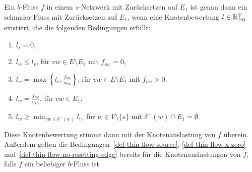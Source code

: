 \begin{lemma}\label{lemma-thin-flow-t-def}
	Ein $b$-Fluss $f$ in einem $s$-Netzwerk mit Zurücksetzen auf $E_1$ ist genau dann ein schmaler Fluss mit Zurücksetzen auf $E_1$, wenn eine Knotenbewertung $l\in\mathbb{R}_{\geq 0}^V$ existiert, die die folgenden Bedingungen erfüllt:
	\begin{enumerate}[label=(T\arabic*)]
		\item\label{def-thin-flow-source} $\displaystyle l_s = 0$,
		\item\label{def-thin-flow-x-zero} $\displaystyle l_w \leq l_v$, \tabto{4.5cm} für $vw\in E \setminus E_1$ mit $f_{vw}=0$,
		\item\label{def-thin-flow-x-positive} $\displaystyle l_w = \max\left\{ l_v, \frac{f_{vw}}{u_{vw}} \right\}$, \tabto{4.5cm} für $vw\in E\setminus E_1$ mit $f_{vw} > 0$,
		\item\label{def-thin-flow-resetting-edge} $\displaystyle l_w = \frac{f_{vw}}{u_{vw}}$, \tabto{4.5cm} für $vw\in E_1$,
		\item\label{def-thin-flow-no-resetting-edge} $\displaystyle l_w \geq \min_{vw\in \delta^-(w)} l_v$, \tabto{4.5cm} für $w\in V\setminus \{ s \}$ mit $\delta^-(w)\cap E_1 = \emptyset$.
	\end{enumerate}
	Diese Knotenbewertung stimmt dann mit der Knotenauslastung von $f$ überein.
	Außerdem gelten die Bedingungen~\ref{def-thin-flow-source}, \ref{def-thin-flow-x-zero} und~\ref{def-thin-flow-no-resetting-edge} bereits für die Knotenauslastungen von $f$, falls $f$ ein beliebiger $b$-Fluss ist.
\end{lemma}
